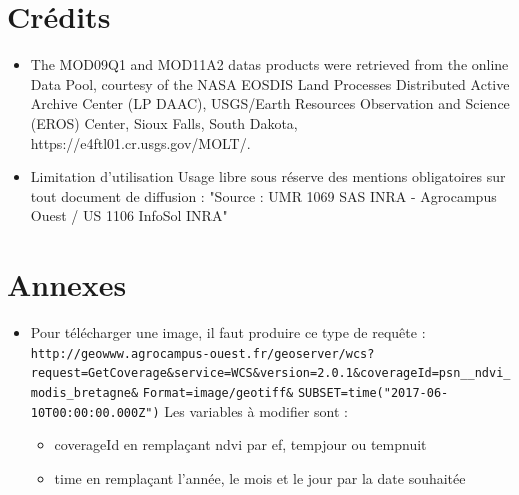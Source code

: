 \documentclass[10pt,a4paper]{article}
\begin{document}
\section{Crédits}
\begin{itemize}
\item The MOD09Q1 and MOD11A2 datas products were retrieved from the online Data Pool, courtesy of the NASA EOSDIS Land Processes Distributed Active Archive Center (LP DAAC), USGS/Earth Resources Observation and Science (EROS) Center, Sioux Falls, South Dakota, https://e4ftl01.cr.usgs.gov/MOLT/. 
\item Limitation d'utilisation
Usage libre sous réserve des mentions obligatoires sur tout document de diffusion : "Source : UMR 1069 SAS INRA - Agrocampus Ouest / US 1106 InfoSol INRA" 
\end{itemize}

\section{Annexes}

\begin{itemize}
\item Pour télécharger une image, il faut produire ce type de requête : \newline
\verb!http://geowww.agrocampus-ouest.fr/geoserver/wcs?!\newline\verb!request=GetCoverage&service=WCS&version=2.0.1&!\newline\verb!coverageId=psn__ndvi_modis_bretagne&!
\newline\verb!Format=image/geotiff&!
\newline\verb!SUBSET=time("2017-06-10T00:00:00.000Z")! \smallbreak 
Les variables à modifier sont :
\begin{itemize}
\item coverageId en remplaçant ndvi par ef, tempjour ou tempnuit
\item time en remplaçant l'année, le mois et le jour par la date souhaitée
\end{itemize}
\end{itemize}
\end{document}
